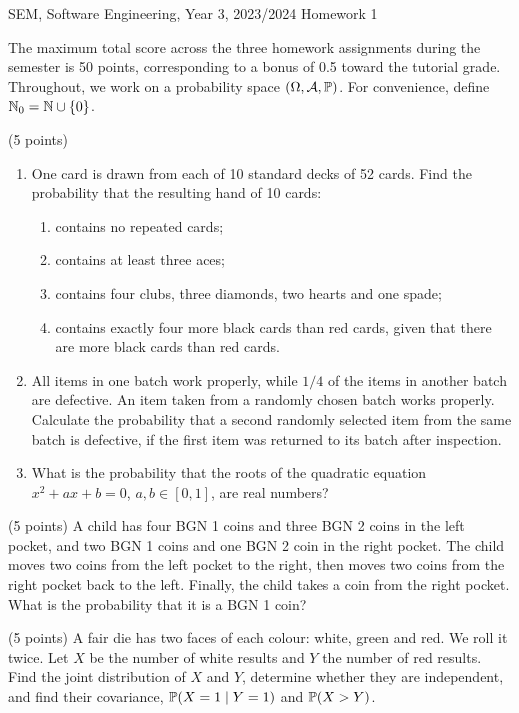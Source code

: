 \documentclass[a4paper]{report}
\begin{document}
\noindent SEM, Software Engineering, Year 3, 2023/2024 \hfill Homework 1
\hrulefill
\begin{it}
The maximum total score across the three homework assignments during the semester is 50 points, corresponding to a bonus of 0.5 toward the tutorial grade.
Throughout, we work on a probability space $(\Omega,\mathcal A,\P)$. For convenience, define $\N_0=\N\cup\{0\}$.
\end{it}
\begin{problem} (5 points)
\begin{enumerate}
\item One card is drawn from each of 10 standard decks of 52 cards. Find the probability that the resulting hand of 10 cards:
\begin{enumerate}
\item contains no repeated cards;
\item contains at least three aces;
\item contains four clubs, three diamonds, two hearts and one spade;
\item contains exactly four more black cards than red cards, given that there are more black cards than red cards.
\end{enumerate}
\item All items in one batch work properly, while $1/4$ of the items in another batch are defective. An item taken from a randomly chosen batch works properly. Calculate the probability that a second randomly selected item from the same batch is defective, if the first item was returned to its batch after inspection.
\item What is the probability that the roots of the quadratic equation $x^2+ax+b=0$, $a,b\in[0,1]$, are real numbers?
\end{enumerate}
\end{problem}
\begin{problem} (5 points)
A child has four BGN 1 coins and three BGN 2 coins in the left pocket, and two BGN 1 coins and one BGN 2 coin in the right pocket. The child moves two coins from the left pocket to the right, then moves two coins from the right pocket back to the left. Finally, the child takes a coin from the right pocket. What is the probability that it is a BGN 1 coin?
\end{problem}
\begin{problem} (5 points)
A fair die has two faces of each colour: white, green and red. We roll it twice. Let $X$ be the number of white results and $Y$ the number of red results. Find the joint distribution of $X$ and $Y$, determine whether they are independent, and find their covariance, $\P(X=1\mid Y=1)$ and $\P(X>Y)$.
\end{problem}
\end{document}
